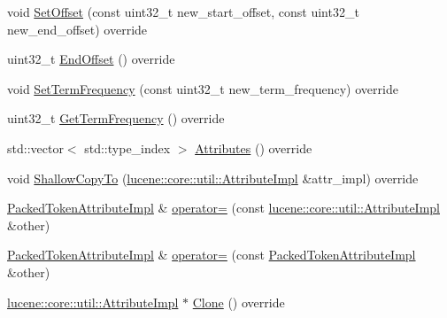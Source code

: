 \begin{DoxyCompactItemize}
\item 
void \mbox{\hyperlink{classlucene_1_1core_1_1analysis_1_1tokenattributes_1_1PackedTokenAttributeImpl_aa17ed401f2b9f6bd773291de1d02bb35}{Set\+Offset}} (const uint32\+\_\+t new\+\_\+start\+\_\+offset, const uint32\+\_\+t new\+\_\+end\+\_\+offset) override
\item 
uint32\+\_\+t \mbox{\hyperlink{classlucene_1_1core_1_1analysis_1_1tokenattributes_1_1PackedTokenAttributeImpl_ae6210d544884be562c186a040d91157f}{End\+Offset}} () override
\item 
void \mbox{\hyperlink{classlucene_1_1core_1_1analysis_1_1tokenattributes_1_1PackedTokenAttributeImpl_a4d9dfc6cc7c825d42789245b8ca003c4}{Set\+Term\+Frequency}} (const uint32\+\_\+t new\+\_\+term\+\_\+frequency) override
\item 
uint32\+\_\+t \mbox{\hyperlink{classlucene_1_1core_1_1analysis_1_1tokenattributes_1_1PackedTokenAttributeImpl_a82aff8ded68bf64ab156382ca6862db2}{Get\+Term\+Frequency}} () override
\item 
std\+::vector$<$ std\+::type\+\_\+index $>$ \mbox{\hyperlink{classlucene_1_1core_1_1analysis_1_1tokenattributes_1_1PackedTokenAttributeImpl_a450b5fd90cbf05268800b0f66eebb58f}{Attributes}} () override
\item 
void \mbox{\hyperlink{classlucene_1_1core_1_1analysis_1_1tokenattributes_1_1PackedTokenAttributeImpl_ab89c820321f0f5b84c7a392bb8de32f3}{Shallow\+Copy\+To}} (\mbox{\hyperlink{classlucene_1_1core_1_1util_1_1AttributeImpl}{lucene\+::core\+::util\+::\+Attribute\+Impl}} \&attr\+\_\+impl) override
\item 
\mbox{\hyperlink{classlucene_1_1core_1_1analysis_1_1tokenattributes_1_1PackedTokenAttributeImpl}{Packed\+Token\+Attribute\+Impl}} \& \mbox{\hyperlink{classlucene_1_1core_1_1analysis_1_1tokenattributes_1_1PackedTokenAttributeImpl_a9519720f5eb790ef3e796cefbcbecc96}{operator=}} (const \mbox{\hyperlink{classlucene_1_1core_1_1util_1_1AttributeImpl}{lucene\+::core\+::util\+::\+Attribute\+Impl}} \&other)
\item 
\mbox{\hyperlink{classlucene_1_1core_1_1analysis_1_1tokenattributes_1_1PackedTokenAttributeImpl}{Packed\+Token\+Attribute\+Impl}} \& \mbox{\hyperlink{classlucene_1_1core_1_1analysis_1_1tokenattributes_1_1PackedTokenAttributeImpl_a87fbfcbb26c03dc5fd6d6d51fc41e817}{operator=}} (const \mbox{\hyperlink{classlucene_1_1core_1_1analysis_1_1tokenattributes_1_1PackedTokenAttributeImpl}{Packed\+Token\+Attribute\+Impl}} \&other)
\item 
\mbox{\hyperlink{classlucene_1_1core_1_1util_1_1AttributeImpl}{lucene\+::core\+::util\+::\+Attribute\+Impl}} $\ast$ \mbox{\hyperlink{classlucene_1_1core_1_1analysis_1_1tokenattributes_1_1PackedTokenAttributeImpl_ab96495b9ba0271afe2597425f925ee91}{Clone}} () override
\end{DoxyCompactItemize}
